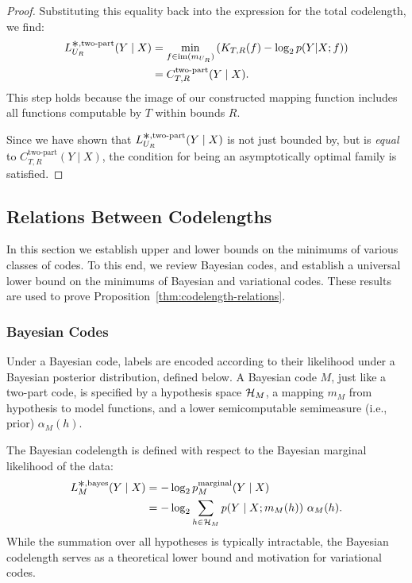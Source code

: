 \begin{proof}
Substituting this equality back into the expression for the total codelength, we find:
\begin{align*}
L^{\bigast,\text{two-part}}_{U_R}(Y \mid X) &= \min_{f \in \im(m_{U_R})} \left( K_{T,R}(f) - \log_2 p(Y|X;f) \right) \\
&= C^{\text{two-part}}_{T,R}(Y \mid X).
\end{align*}
This step holds because the image of our constructed mapping function includes all functions computable by $T$ within bounds $R$.

Since we have shown that $L^{\bigast,\text{two-part}}_{U_R}(Y \mid X)$ is not just bounded by, but is \emph{equal} to $C^{\text{two-part}}_{T,R}(Y \mid X)$, the condition for being an asymptotically optimal family is satisfied.
\end{proof}


\subsection{Relations Between Codelengths}
\label{sec:relations-between-codes}

In this section we establish upper and lower bounds on the minimums of various classes of codes. To this end, we review Bayesian codes, and establish a universal lower bound on the minimums of Bayesian and variational codes. These results are used to prove Proposition~\ref{thm:codelength-relations}.

\subsubsection{Bayesian Codes}
Under a Bayesian code, labels are encoded according to their likelihood under a Bayesian posterior distribution, defined below. 
 A Bayesian code $M$, just like a two-part code, is specified by a hypothesis space ${\mathcal{H}}_M$, a mapping $m_M$ from hypothesis to model functions, and a lower semicomputable semimeasure (i.e., prior) $\alpha_M(h)$.

The Bayesian codelength is defined with respect to the Bayesian marginal likelihood of the data:
\begin{align}
    L^{\bigast,\text{bayes}}_M(Y \mid X) &= -\log_2 p^{\text{marginal}}_M(Y \mid X) \\
        &= -\log_2 \sum_{h \in \gH_M} p(Y \mid X;m_M(h))~\alpha_M(h).
\end{align}
While the summation over all hypotheses is typically intractable, the Bayesian codelength serves as a theoretical lower bound and motivation for variational codes.

